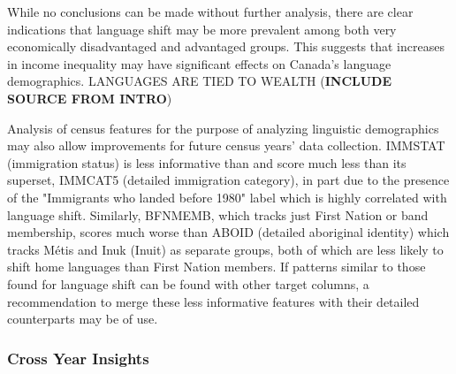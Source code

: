 \documentclass[10pt, conference, compsocconf]{IEEEtran}
\begin{document}
While no conclusions can be made without further analysis, there are clear indications that language shift may be more prevalent among both very economically disadvantaged and advantaged groups.  This suggests that increases in income inequality may have significant effects on Canada's language demographics.  LANGUAGES ARE TIED TO WEALTH (\textbf{INCLUDE SOURCE FROM INTRO})

Analysis of census features for the purpose of analyzing linguistic demographics may also allow improvements for future census years' data collection.  IMMSTAT (immigration status) is less informative than and score much less than its superset, IMMCAT5 (detailed immigration category), in part due to the presence of the "Immigrants who landed before 1980" label which is highly correlated with language shift.  Similarly, BFNMEMB, which tracks just First Nation or band membership, scores much worse than ABOID (detailed aboriginal identity) which tracks Métis and Inuk (Inuit) as separate groups, both of which are less likely to shift home languages than First Nation members.  If patterns similar to those found for language shift can be found with other target columns, a recommendation to merge these less informative features with their detailed counterparts may be of use.

\subsubsection{Cross Year Insights}

\afterpage{%
\clearpage
}
\end{document}
